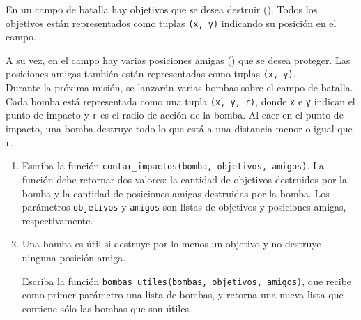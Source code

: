 En un campo de batalla
hay objetivos que se desea destruir (\frownie).
Todos los objetivos están representados
como tuplas \verb+(x, y)+
indicando su posición en el campo.

\begin{minipage}{0.65\textwidth}
  A su vez,
  en el campo hay varias posiciones amigas (\smiley)
  que se desea proteger.
  Las posiciones amigas también están representadas
  como tuplas \verb+(x, y)+.
  \\[1ex]
  Durante la próxima misión,
  se lanzarán varias bombas sobre el campo de batalla.
  Cada bomba está representada
  como una tupla \verb+(x, y, r)+,
  donde \verb+x+ e \verb+y+ indican el punto de impacto
  y \verb+r+ es el radio de acción de la bomba.
  Al caer en el punto de impacto,
  una bomba destruye todo lo que está
  a una distancia menor o igual que \verb+r+.
\end{minipage}
\hfill
\begin{minipage}{.25\textwidth}
  \hfill
\end{minipage}

\begin{enumerate}
  \item Escriba la función \verb+contar_impactos(bomba, objetivos, amigos)+.
    La función debe retornar dos valores:
    la cantidad de objetivos destruidos por la bomba
    y la cantidad de posiciones amigas destruidas por la bomba.
    Los parámetros \verb+objetivos+ y \verb+amigos+
    son listas de objetivos y posiciones amigas, respectivamente.

  \item
    Una bomba es útil si destruye por lo menos un objetivo
    y no destruye ninguna posición amiga.

    Escriba la función \verb+bombas_utiles(bombas, objetivos, amigos)+,
    que recibe como primer parámetro una lista de bombas,
    y retorna una nueva lista que contiene sólo las bombas que son útiles.
\end{enumerate}

